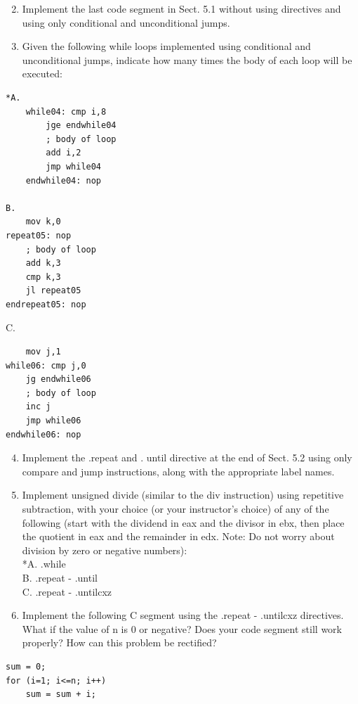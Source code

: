 \documentclass[10pt]{book}
\begin{document}
\begin{enumerate}
  \setcounter{enumi}{1}
  \item Implement the last code segment in Sect. 5.1 without using directives and using only conditional and unconditional jumps.
  \item Given the following while loops implemented using conditional and unconditional jumps, indicate how many times the body of each loop will be executed:
\end{enumerate}

\begin{verbatim}
*A.
    while04: cmp i,8
        jge endwhile04
        ; body of loop
        add i,2
        jmp while04
    endwhile04: nop

B.
    mov k,0
repeat05: nop
    ; body of loop
    add k,3
    cmp k,3
    jl repeat05
endrepeat05: nop
\end{verbatim}

C.

\begin{verbatim}
    mov j,1
while06: cmp j,0
    jg endwhile06
    ; body of loop
    inc j
    jmp while06
endwhile06: nop
\end{verbatim}

\begin{enumerate}
  \setcounter{enumi}{3}
  \item Implement the .repeat and . until directive at the end of Sect. 5.2 using only compare and jump instructions, along with the appropriate label names.
  \item Implement unsigned divide (similar to the div instruction) using repetitive subtraction, with your choice (or your instructor's choice) of any of the following (start with the dividend in eax and the divisor in ebx, then place the quotient in eax and the remainder in edx. Note: Do not worry about division by zero or negative numbers):\\
*A. .while\\
B. .repeat - .until\\
C. .repeat - .untilcxz
  \item Implement the following C segment using the .repeat - .untilcxz directives. What if the value of n is 0 or negative? Does your code segment still work properly? How can this problem be rectified?
\end{enumerate}

\begin{verbatim}
sum = 0;
for (i=1; i<=n; i++)
    sum = sum + i;
\end{verbatim}
\end{document}
